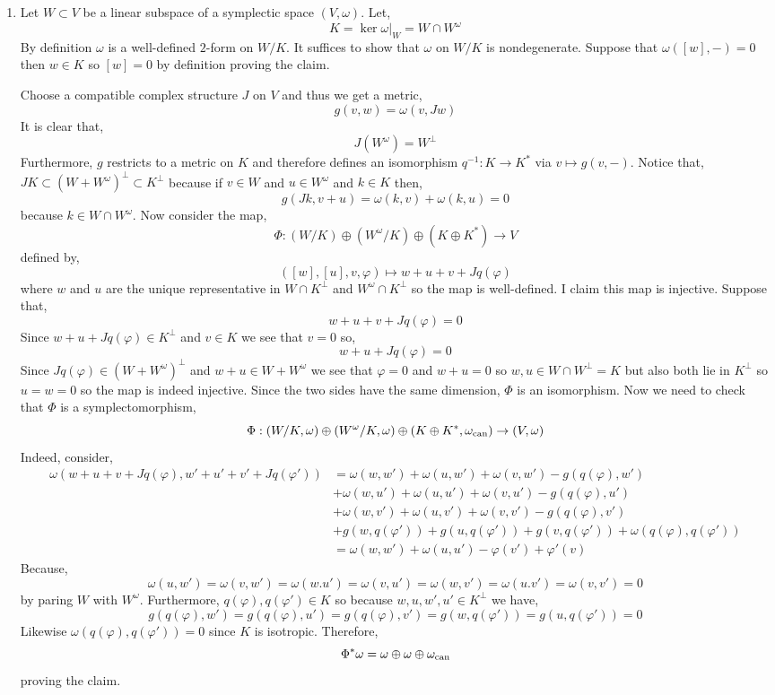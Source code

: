 \documentclass[12pt]{article}
\begin{document}
\begin{enumerate}
\item Let $W \subset V$ be a linear subspace of a symplectic space $(V, \omega)$. Let,
\[ K = \ker{\omega|_W} = W \cap W^\omega \]
By definition $\omega$ is a well-defined $2$-form on $W/K$. It suffices to show that $\omega$ on $W/K$ is nondegenerate. Suppose that $\omega([w], -) = 0$ then $w \in K$ so $[w] = 0$ by definition proving the claim. 






Choose a compatible complex structure $J$ on $V$ and thus we get a metric,
\[ g(v,w) = \omega(v, J w) \]
It is clear that,
\[ J(W^\omega) = W^\perp \]
Furthermore, $g$ restricts to a metric on $K$ and therefore defines an isomorphism $q^{-1} : K \to K^*$ via $v \mapsto g(v,-)$. Notice that, $J K \subset (W + W^\omega)^\perp \subset K^\perp$ because if $v \in W$ and $u \in W^\omega$ and $k \in K$ then,
\[ g(Jk, v + u) = \omega(k,v) + \omega(k,u) = 0 \]
because $k \in W \cap W^\omega$. Now consider the map,
\[  \Phi : (W / K) \oplus (W^\omega / K) \oplus (K \oplus K^*) \to V \]
defined by,
\[ ([w], [u], v, \varphi) \mapsto w + u + v + J q(\varphi) \]
where $w$ and $u$ are the unique representative in $W \cap K^\perp$ and $W^\omega \cap K^\perp$ so the map is well-defined. I claim this map is injective. Suppose that,
\[ w + u + v + J q(\varphi) = 0 \]
Since $w + u + J q(\varphi) \in K^\perp$ and $v \in K$ we see that $v = 0$ so,
\[ w + u + J q(\varphi) = 0 \]
Since $J q(\varphi) \in (W + W^\omega)^\perp$ and $w + u \in W + W^\omega$ we see that $\varphi = 0$ and $w + u = 0$ so $w, u \in W \cap W^\perp = K$ but also both lie in $K^\perp$ so $u = w = 0$ so the map is indeed injective. Since the two sides have the same dimension, $\Phi$ is an isomorphism. Now we need to check that $\Phi$ is a symplectomorphism,
\[ \Phi : (W/K, \omega) \oplus (W^\omega / K, \omega) \oplus (K \oplus K^*, \omega_{\mathrm{can}}) \to (V, \omega) \]
Indeed, consider,
\begin{align*}
\omega(w + u + v + J q(\varphi), w' + u' + v' + J q(\varphi')) & = \omega(w, w') + \omega(u, w') + \omega(v, w') - g(q(\varphi), w') 
\\
&+ \omega(w, u') + \omega(u, u') + \omega(v, u') - g(q(\varphi), u') 
\\
&+ \omega(w, v') + \omega(u, v') + \omega(v, v') - g(q(\varphi), v') 
\\
&+ g(w, q(\varphi')) + g(u, q(\varphi')) + g(v, q(\varphi')) + \omega(q(\varphi), q(\varphi'))
\\
& = \omega(w, w') + \omega(u, u') - \varphi(v') + \varphi'(v)
\end{align*}
Because,
\[ \omega(u, w') = \omega(v, w') = \omega(w.u') = \omega(v, u') = \omega(w, v') = \omega(u. v') = \omega(v, v') = 0 \]
by paring $W$ with $W^\omega$. Furthermore, $q(\varphi), q(\varphi') \in K$ so because $w,u,w',u' \in K^\perp$ we have,
\[ g(q(\varphi), w') = g(q(\varphi), u') = g(q(\varphi), v') = g(w, q(\varphi')) = g(u, q(\varphi')) = 0 \]
Likewise $\omega(q(\varphi), q(\varphi')) = 0$ since $K$ is isotropic. Therefore, 
\[ \Phi^* \omega = \omega \oplus \omega \oplus \omega_{\mathrm{can}} \]
proving the claim.



\end{enumerate}
\end{document}
